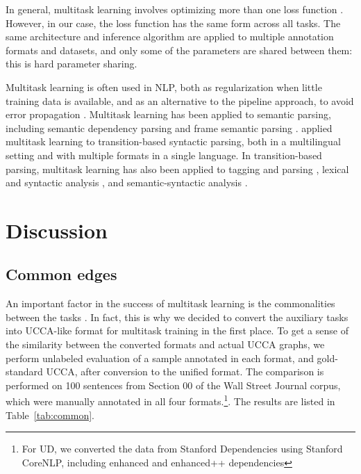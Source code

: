 \documentclass[11pt,a4paper]{article}
\begin{document}
In general, multitask learning involves optimizing more than one loss function \cite{ruder2017overview}.
However, in our case, the loss function has the same form across all tasks.
The same architecture and inference algorithm are applied to multiple annotation formats and datasets,
and only some of the parameters are shared between them: this is hard parameter sharing.

Multitask learning is often used in NLP, both as regularization when little training data is available,
and as an alternative to the pipeline approach, to avoid error propagation
\cite{collobert2008unified}.
Multitask learning has been applied to semantic parsing, including
semantic dependency parsing \cite{P17-1186} and
frame semantic parsing \cite{swayamdipta2017frame}.
\citet{guo2016exploiting} applied multitask learning to transition-based
syntactic parsing,
both in a multilingual setting and with multiple formats in a single language.
In transition-based parsing, multitask learning has also been applied to
tagging and parsing \cite{bohnet2012transition,Zhang2016StackpropagationIR},
lexical and syntactic analysis \cite{constant-nivre:2016:P16-1,more2016joint},
and semantic-syntactic analysis \cite{swayamdipta-EtAl:2016:CoNLL,henderson2013multilingual}.


\section{Discussion}\label{sec:discussion}

\subsection{Common edges}\label{sec:common}

An important factor in the success of multitask learning is the commonalities between the tasks
\cite{E17-2026,E17-1005}.
In fact, this is why we decided to convert the auxiliary tasks into UCCA-like format for
multitask training in the first place.
To get a sense of the similarity between the converted formats and actual UCCA graphs,
we perform unlabeled evaluation of a sample annotated in each format, and gold-standard UCCA,
after conversion to the unified format.
The comparison is performed on 100 sentences from Section 00 of the Wall Street Journal
corpus, which were manually annotated in all four formats.\footnote{For UD, we converted the
data from Stanford Dependencies using Stanford CoreNLP, including enhanced and enhanced++
dependencies\cite{SCHUSTER16.779}}.
The results are listed in Table~\ref{tab:common}.
\end{document}
